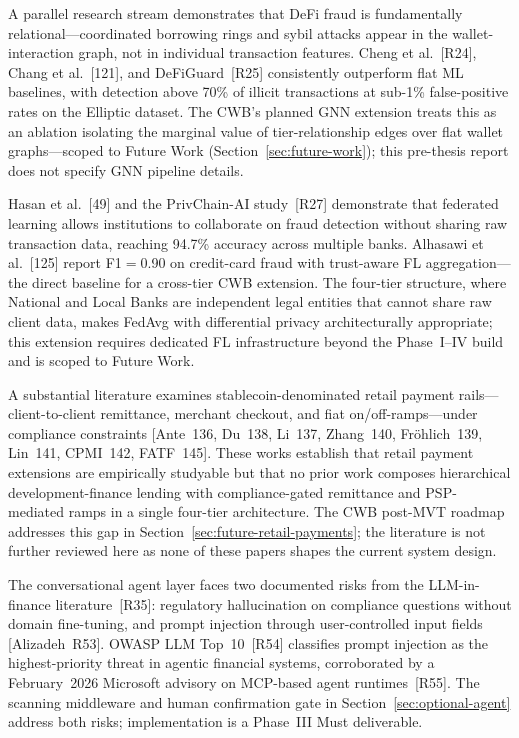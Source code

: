 \documentclass[12pt,a4paper]{report}
\begin{document}
A parallel research stream demonstrates that DeFi fraud is fundamentally relational---coordinated borrowing rings and sybil attacks appear in the wallet-interaction graph, not in individual transaction features. Cheng et al.~[R24], Chang et al.~[121], and DeFiGuard~[R25] consistently outperform flat ML baselines, with detection above 70\% of illicit transactions at sub-1\% false-positive rates on the Elliptic dataset. The CWB's planned GNN extension treats this as an ablation isolating the marginal value of tier-relationship edges over flat wallet graphs---scoped to Future Work (Section~\ref{sec:future-work}); this pre-thesis report does not specify GNN pipeline details.

Hasan et al.~[49] and the PrivChain-AI study~[R27] demonstrate that federated learning allows institutions to collaborate on fraud detection without sharing raw transaction data, reaching 94.7\% accuracy across multiple banks. Alhasawi et al.~[125] report F1$=$0.90 on credit-card fraud with trust-aware FL aggregation---the direct baseline for a cross-tier CWB extension. The four-tier structure, where National and Local Banks are independent legal entities that cannot share raw client data, makes FedAvg with differential privacy architecturally appropriate; this extension requires dedicated FL infrastructure beyond the Phase~I--IV build and is scoped to Future Work.

A substantial literature examines stablecoin-denominated retail payment rails---client-to-client remittance, merchant checkout, and fiat on/off-ramps---under compliance constraints [Ante~136, Du~138, Li~137, Zhang~140, Fr\"{o}hlich~139, Lin~141, CPMI~142, FATF~145]. These works establish that retail payment extensions are empirically studyable but that no prior work composes hierarchical development-finance lending with compliance-gated remittance and PSP-mediated ramps in a single four-tier architecture. The CWB post-MVT roadmap addresses this gap in Section~\ref{sec:future-retail-payments}; the literature is not further reviewed here as none of these papers shapes the current system design.

The conversational agent layer faces two documented risks from the LLM-in-finance literature~[R35]: regulatory hallucination on compliance questions without domain fine-tuning, and prompt injection through user-controlled input fields [Alizadeh~R53]. OWASP LLM Top~10~[R54] classifies prompt injection as the highest-priority threat in agentic financial systems, corroborated by a February~2026 Microsoft advisory on MCP-based agent runtimes~[R55]. The scanning middleware and human confirmation gate in Section~\ref{sec:optional-agent} address both risks; implementation is a Phase~III Must deliverable.
\end{document}
